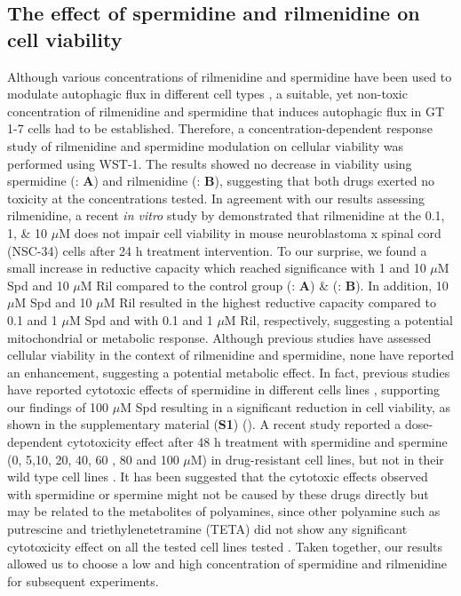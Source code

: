 {\subsection{The effect of spermidine and rilmenidine on cell viability}
Although various concentrations of rilmenidine and spermidine have been used to modulate autophagic flux in different cell types \citep{Perera2018,Wang2018}, a suitable, yet non-toxic concentration of rilmenidine and spermidine that induces autophagic flux in GT 1-7 cells had to be established. Therefore, a concentration-dependent response study of rilmenidine and spermidine modulation on cellular viability was performed using WST-1. The results showed no decrease in viability using spermidine (: \textbf{A}) and rilmenidine (: \textbf{B}), suggesting that both drugs exerted no toxicity at the concentrations tested. In agreement with our results assessing rilmenidine,  a recent \textit{in vitro} study by \citet{Perera2018} demonstrated that rilmenidine  at the  0.1, 1, \& 10 $\mu$M does not impair cell viability in mouse neuroblastoma x spinal cord (NSC-34) cells after 24 h treatment intervention. To our surprise, we found a small increase in reductive capacity which reached significance with 1 and 10 $\mu$M Spd and 10 $\mu$M Ril compared to the control group (: \textbf{A})  \& (: \textbf{B}). In addition, 10 $\mu$M Spd and 10 $\mu$M Ril resulted in the highest reductive capacity compared to 0.1 and 1 $\mu$M Spd and with 0.1 and 1 $\mu$M Ril, respectively, suggesting a potential mitochondrial or metabolic response. Although previous studies have assessed cellular viability in the context of rilmenidine and spermidine, none have reported an enhancement, suggesting a potential metabolic effect. In fact, previous studies  have reported cytotoxic effects of spermidine in different cells lines \citep{He1993,Poulin1995,Poulin1993}, supporting our findings of 100 $\mu$M Spd resulting in a significant reduction in cell viability, as shown in the supplementary material (\textbf{S1}) (). A recent study reported a dose-dependent cytotoxicity effect after 48 h treatment with spermidine and spermine (0, 5,10, 20, 40, 60 , 80 and 100 $\mu$M) in drug-resistant cell lines, but not in their wild type cell lines \citep{Wang2018}. It has been suggested that the cytotoxic effects observed with spermidine or spermine might not be caused by these drugs directly but may be related to the metabolites of polyamines, since other polyamine such as putrescine and triethylenetetramine (TETA) did not show any significant cytotoxicity effect on all the tested cell lines tested \citep{Wang2018}. Taken together, our results allowed us to choose a low and high concentration of spermidine and rilmenidine for subsequent experiments.

}
